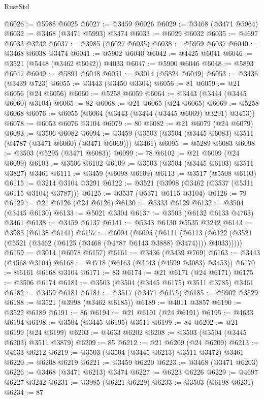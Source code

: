 \begin{lexlean}{RustStd}
\begin{coremodule}
@6026 := @5988 @6025
@6027 := @3459 @6026
@6029 := @3468 (@3471 @5964)
@6032 := @3468 (@3471 @5993) @3474
@6033 := @6029 @6032
@6035 := @4697 @6033 @3242
@6037 := @3985 (@6027 @6035)
@6038 := @5959 @6037
@6040 := @3468 @6038 @3474
@6041 := @5902 @6040
@6042 := @4425 @6041
@6046 := @3521 (@5448 (@3462 @6042)) @4033
@6047 := @5900 @6046
@6048 := @5893 @6047
@6049 := @5891 @6048
@6051 := @3014 (@5824 @6049)
@6053 := @3436 (@3439 @723)
@6055 := @3443 (@3450 @3304)
@6056 := 81
@6059 := @21 @6056 (@24 @6056)
@6060 := @5258 @6059
@6064 := @3443 (@3444 (@3445 @6060) @3104)
@6065 := 82
@6068 := @21 @6065 (@24 @6065)
@6069 := @5258 @6068
@6076 := @6055 (@6064 (@3443 (@3444 (@3445 @6069) @3291) @3453))
@6078 := @6053 @6076 @3104
@6079 := 80
@6082 := @21 @6079 (@24 @6079)
@6083 := @3506 @6082
@6094 := @3459 (@3503 (@3504 (@3445 @6083) @3511 (@4787 (@3471 @6060) (@3471 @6069))) @3461)
@6095 := @5289 @6083
@6098 := @3503 (@5295 (@3471 @6083))
@6099 := 78
@6102 := @21 @6099 (@24 @6099)
@6103 := @3506 @6102
@6109 := @3503 (@3504 (@3445 @6103) @3511 @3827) @3461
@6111 := @3459 (@6098 @6109)
@6113 := @3517 (@5508 @6103)
@6115 := @3214 @3104 @3291
@6122 := @3521 (@3998 (@3462 (@3537 (@5311 @6115 @3104) @3787)))
@6125 := @3537 (@5371 @6115 @3104)
@6126 := 79
@6129 := @21 @6126 (@24 @6126)
@6130 := @5333 @6129
@6132 := @3504 (@3445 @6130)
@6133 := @5021 @3304
@6137 := @3503 (@6132 @6133 @4763) @3461
@6138 := @3459 @6137
@6141 := @5343 @6130 @5535 @3242
@6143 := @3985 (@6138 @6141)
@6157 := @6094
    (@6095
      (@6111
        (@6113 (@6122 (@3521 (@5521 (@3462 (@6125 (@3468 (@4787 @6143 @3888) @3474)))) @4033)))))
@6159 := @3014 (@6078 @6157)
@6161 := @3436 (@3439 @769)
@6163 := @3443 (@4568 @3104)
@6168 := @4718 (@6163 (@3443 (@4599 @3083) @3453))
@6170 := @6161 @6168 @3104
@6171 := 83
@6174 := @21 @6171 (@24 @6171)
@6175 := @3506 @6174
@6181 := @3503 (@3504 (@3445 @6175) @3511 @3785) @3461
@6182 := @3459 @6181
@6184 := @3517 (@3471 @6175)
@6185 := @5902 @3829
@6188 := @3521 (@3998 (@3462 @6185))
@6189 := @4011 @3857
@6190 := @3522 @6189
@6191 := 86
@6194 := @21 @6191 (@24 @6191)
@6195 := @4633 @6194
@6198 := @3504 (@3445 @6195) @3511
@6199 := 84
@6202 := @21 @6199 (@24 @6199)
@6203 := @4633 @6202
@6208 := @3503 (@3504 (@3445 @6203) @3511 @3879)
@6209 := 85
@6212 := @21 @6209 (@24 @6209)
@6213 := @4633 @6212
@6219 := @3503 (@3504 (@3445 @6213) @3511 @3472) @3461
@6220 := @6208 @6219
@6221 := @3459 @6220
@6223 := @3468 (@3471 @6203)
@6226 := @3468 (@3471 @6213) @3474
@6227 := @6223 @6226
@6229 := @4697 @6227 @3242
@6231 := @3985 (@6221 @6229)
@6233 := @3503 (@6198 @6231)
@6234 := 87

\end{coremodule}
\end{lexlean}
